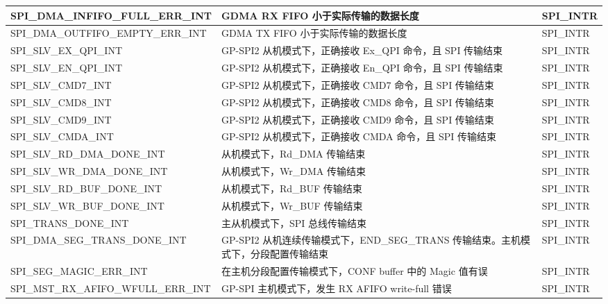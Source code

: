 \documentclass[main\_\_CN.tex]{subfiles}
\begin{document}
\begin{longtable}{ | L{6cm} | L{8.5cm} | L{2.5cm} | }
\label{int:SPIINFIFOFULLERRINT}SPI\_DMA\_INFIFO\_FULL\_ERR\_INT &  GDMA RX FIFO 小于实际传输的数据长度 &  SPI\_INTR  \\ \hline
\label{int:SPIOUTFIFOEMPTYERRINT}SPI\_DMA\_OUTFIFO\_EMPTY\_ERR\_INT & GDMA TX FIFO 小于实际传输的数据长度 &  SPI\_INTR \\ \hline
\label{int:SPISLVEXQPIINT} SPI\_SLV\_EX\_QPI\_INT& GP-SPI2 从机模式下，正确接收 Ex\_QPI 命令，且 SPI 传输结束& SPI\_INTR \\ \hline
\label{int:SPISLVENQPIINT} SPI\_SLV\_EN\_QPI\_INT &  GP-SPI2 从机模式下，正确接收 En\_QPI 命令，且 SPI 传输结束 & SPI\_INTR \\ \hline
\label{int:SPISLVCMD7INT}SPI\_SLV\_CMD7\_INT & GP-SPI2 从机模式下，正确接收 CMD7 命令，且 SPI 传输结束& SPI\_INTR \\ \hline
\label{int:SPISLVCMD8INT}SPI\_SLV\_CMD8\_INT& GP-SPI2 从机模式下，正确接收 CMD8 命令，且 SPI 传输结束& SPI\_INTR \\ \hline
\label{int:SPISLVCMD9INT}SPI\_SLV\_CMD9\_INT & GP-SPI2 从机模式下，正确接收 CMD9 命令，且 SPI 传输结束& SPI\_INTR \\ \hline
\label{int:SPISLVCMDAINT}SPI\_SLV\_CMDA\_INT & GP-SPI2 从机模式下，正确接收 CMDA 命令，且 SPI 传输结束& SPI\_INTR \\ \hline
\label{int:SPISLVRDDMADONEINT} SPI\_SLV\_RD\_DMA\_DONE\_INT & 从机模式下，Rd\_DMA 传输结束 & SPI\_INTR \\ \hline
\label{int:SPISLVWRDMADONEINT}SPI\_SLV\_WR\_DMA\_DONE\_INT &从机模式下，Wr\_DMA 传输结束 & SPI\_INTR \\ \hline
\label{int:SPISLVRDBUFDONEINT}SPI\_SLV\_RD\_BUF\_DONE\_INT & 从机模式下，Rd\_BUF 传输结束 & SPI\_INTR \\ \hline
\label{int:SPISLVWRBUFDONEINT}SPI\_SLV\_WR\_BUF\_DONE\_INT & 从机模式下，Wr\_BUF 传输结束 & SPI\_INTR \\ \hline
\label{int:SPITRANSDONEINT}SPI\_TRANS\_DONE\_INT & 主从机模式下，SPI 总线传输结束 & SPI\_INTR \\ \hline
\label{int:SPIDMASEGTRANSDONEINT}SPI\_DMA\_SEG\_TRANS\_DONE\_INT & GP-SPI2 从机连续传输模式下，END\_SEG\_TRANS 传输结束。主机模式下，分段配置传输结束 & SPI\_INTR\\ \hline
\label{int:SPISEGMAGICERRINT} SPI\_SEG\_MAGIC\_ERR\_INT & 在主机分段配置传输模式下，CONF buffer 中的 Magic 值有误 & SPI\_INTR \\ \hline
\label{int:SPIMSTRXAFIFOWFULLERRINT} SPI\_MST\_RX\_AFIFO\_WFULL\_ERR\_INT & GP-SPI 主机模式下，发生 RX AFIFO write-full 错误 & SPI\_INTR \\ \hline

\end{longtable}
\end{document}
